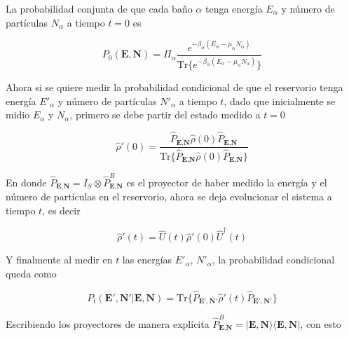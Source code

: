 La probabilidad conjunta de que cada baño $\alpha$ tenga energía $E_{\alpha}$ y número de partículas $N_{\alpha}$ a tiempo $t=0$ es

\begin{equation*}
    P_{0}(\textbf{E},\textbf{N}) = \Pi_{\alpha}  \frac{e^{-\beta_{\alpha}(E_{\alpha} - \mu_{\alpha}N_{\alpha} )  }}{ \text{Tr}\{e^{-\beta_{\alpha}(E_{\alpha} - \mu_{\alpha}N_{\alpha} )  }\} } 
\end{equation*}

Ahora si se quiere medir la probabilidad condicional de que el reservorio tenga energía $E'_{\alpha}$ y número de partículas $N'_{\alpha}$ a tiempo $t$, dado que inicialmente se midio $E_{\alpha}$ y $N_{\alpha}$, primero se debe partir del estado medido a $t=0$

\begin{equation*}
    \hat{\rho}'(0) = \frac{\hat{P}_{\textbf{E}, \textbf{N} }\hat{\rho}(0) \hat{P}_{\textbf{E}, \textbf{N} } }{\text{Tr}\{\hat{P}_{\textbf{E}, \textbf{N} }\hat{\rho}(0) \hat{P}_{\textbf{E}, \textbf{N} } \} }
\end{equation*}

En donde $\hat{P}_{\textbf{E}, \textbf{N} } = I_{S} \otimes \hat{P}^{B}_{\textbf{E}, \textbf{N} }$ es el proyector de haber medido la energía y el número de partículas en el reservorio, ahora se deja evolucionar el sistema a tiempo $t$, es decir

\begin{equation*}
    \hat{\rho}'(t) = \hat{U}(t)\hat{\rho}'(0)\hat{U}^{\dagger}(t)
\end{equation*}

Y finalmente al medir en $t$ las energías $E'_{\alpha}$, $N'_{\alpha}$, la probabilidad condicional queda como

\begin{equation*}
    P_{t}(\textbf{E}',\textbf{N}'|\textbf{E},\textbf{N}) = \text{Tr}\{\hat{P}_{\textbf{E}', \textbf{N}' }\hat{\rho}'(t) \hat{P}_{\textbf{E}', \textbf{N}' } \}
\end{equation*}

Escribiendo los proyectores de manera explícita $\hat{P}^{B}_{\textbf{E}, \textbf{N} } = |\textbf{E}, \textbf{N} \rangle\langle \textbf{E}, \textbf{N}|$, con esto 

